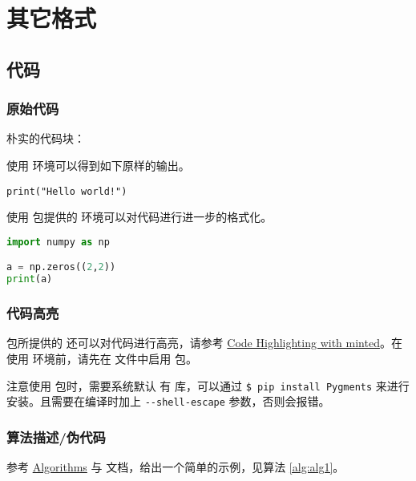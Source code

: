 
\chapter{其它格式}
\section{代码}
\subsection{原始代码}
朴实的代码块：

使用  环境可以得到如下原样的输出。
\begin{verbatim}
print("Hello world!")
\end{verbatim}

使用  包提供的  环境可以对代码进行进一步的格式化。
\begin{lstlisting}[language=Python,frame=single]
import numpy as np

a = np.zeros((2,2))
print(a)
\end{lstlisting}

\subsection{代码高亮}
 包所提供的  还可以对代码进行高亮，请参考 \href{https://www.overleaf.com/learn/latex/Code_Highlighting_with_minted}{Code Highlighting with minted}。在使用  环境前，请先在 文件中启用  包。

注意使用  包时，需要系统默认  有  库，可以通过 \verb|$ pip install Pygments| 来进行安装。且需要在编译时加上 \verb|--shell-escape| 参数，否则会报错。



\subsection{算法描述/伪代码}
参考 \href{https://en.wikibooks.org/wiki/LaTeX/Algorithms}{Algorithms} 与  文档，给出一个简单的示例，见算法 \ref{alg:alg1}。

